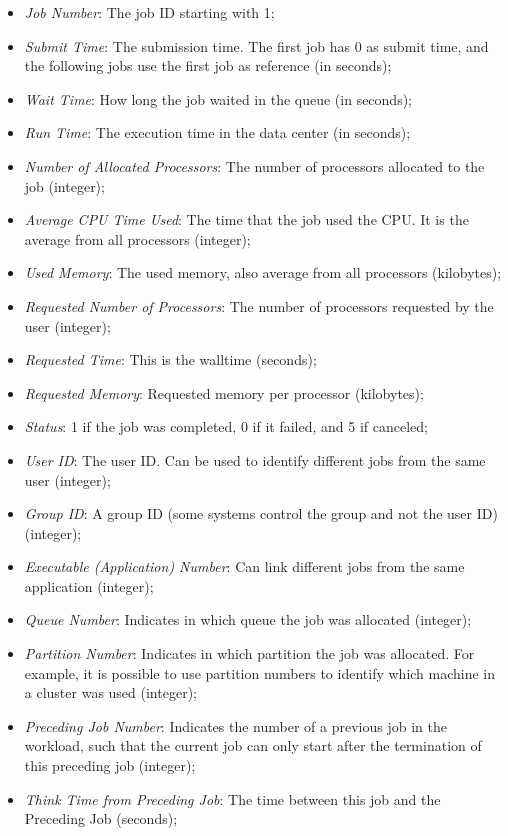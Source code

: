 \begin{itemize}
    \item \textit{Job Number}: The job ID starting with 1;
    \item \textit{Submit Time}: The submission time. The first job has 0 as submit time, and the following jobs use the first job as reference (in seconds);
    \item \textit{Wait Time}: How long the job waited in the queue (in seconds);
    \item \textit{Run Time}: The execution time in the data center (in seconds);
    \item \textit{Number of Allocated Processors}: The number of processors allocated to the job (integer);
    \item \textit{Average CPU Time Used}: The time that the job used the CPU. It is the average from all processors (integer);
    \item \textit{Used Memory}: The used memory, also average from all processors (kilobytes);
    \item \textit{Requested Number of Processors}: The number of processors requested by the user (integer);
    \item \textit{Requested Time}: This is the walltime (seconds);
    \item \textit{Requested Memory}: Requested memory per processor  (kilobytes);
    \item \textit{Status}: 1 if the job was completed, 0 if it failed, and 5 if canceled;
    \item \textit{User ID}: The user ID. Can be used to identify different jobs from the same user (integer);
    \item \textit{Group ID}: A group ID (some systems control the group and not the user ID) (integer);
    \item \textit{Executable (Application) Number}: Can link different jobs from the same application (integer);
    \item \textit{Queue Number}: Indicates in which queue the job was allocated (integer);
    \item \textit{Partition Number}: Indicates in which partition the job was allocated. For example, it is possible to use partition numbers to identify which machine in a cluster was used (integer);
    \item \textit{Preceding Job Number}: Indicates the number of a previous job in the workload, such that the current job can only start after the termination of this preceding job (integer);
    \item \textit{Think Time from Preceding Job}: The time between this job and the Preceding Job (seconds);
\end{itemize}

